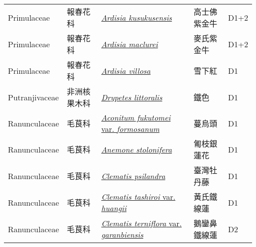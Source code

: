 {\begin{longtable}{p{2.5cm}p{2cm}p{5cm}p{2.5cm}p{3cm}}
    Primulaceae & 報春花科 & \href{http://www.theplantlist.org/tpl1.1/search?q=Ardisia+kusukusensis}{\textit{Ardisia kusukusensis} } & 高士佛紫金牛 & D1+2 \index{Ardisia@\textit{Ardisia}!kusukusensis@\textit{kusukusensis}}  \index{高士佛紫金牛} \\
    Primulaceae & 報春花科 & \href{http://www.theplantlist.org/tpl1.1/search?q=Ardisia+maclurei}{\textit{Ardisia maclurei} } & 麥氏紫金牛 & D1+2 \index{Ardisia@\textit{Ardisia}!maclurei@\textit{maclurei}}  \index{麥氏紫金牛} \\
    Primulaceae & 報春花科 & \href{http://www.theplantlist.org/tpl1.1/search?q=Ardisia+villosa}{\textit{Ardisia villosa} } & 雪下紅 & D1 \index{Ardisia@\textit{Ardisia}!villosa@\textit{villosa}}  \index{雪下紅} \\
    Putranjivaceae & 非洲核果木科 & \href{http://www.theplantlist.org/tpl1.1/search?q=Drypetes+littoralis}{\textit{Drypetes littoralis} } & 鐵色 & D1 \index{Drypetes@\textit{Drypetes}!littoralis@\textit{littoralis}}  \index{鐵色} \\
    Ranunculaceae & 毛茛科 & \href{http://www.theplantlist.org/tpl1.1/search?q=Aconitum+fukutomei+var.+formosanum}{\textit{Aconitum fukutomei} var. \textit{formosanum} } & 蔓烏頭 & D1 \index{Aconitum@\textit{Aconitum}!fukutomei@\textit{fukutomei}!var. formosanum@var. \textit{formosanum}}  \index{蔓烏頭} \\
    Ranunculaceae & 毛茛科 & \href{http://www.theplantlist.org/tpl1.1/search?q=Anemone+stolonifera}{\textit{Anemone stolonifera} } & 匍枝銀蓮花 & D1 \index{Anemone@\textit{Anemone}!stolonifera@\textit{stolonifera}}  \index{匍枝銀蓮花} \\
    Ranunculaceae & 毛茛科 & \href{http://www.theplantlist.org/tpl1.1/search?q=Clematis+psilandra}{\textit{Clematis psilandra} } & 臺灣牡丹藤 & D1 \index{Clematis@\textit{Clematis}!psilandra@\textit{psilandra}}  \index{臺灣牡丹藤} \\
    Ranunculaceae & 毛茛科 & \href{http://www.theplantlist.org/tpl1.1/search?q=Clematis+tashiroi+var.+huangii}{\textit{Clematis tashiroi} var. \textit{huangii} } & 黃氏鐵線蓮 & D1 \index{Clematis@\textit{Clematis}!tashiroi@\textit{tashiroi}!var. huangii@var. \textit{huangii}}  \index{黃氏鐵線蓮} \\
    Ranunculaceae & 毛茛科 & \href{http://www.theplantlist.org/tpl1.1/search?q=Clematis+terniflora+var.+garanbiensis}{\textit{Clematis terniflora} var. \textit{garanbiensis} } & 鵝鑾鼻鐵線蓮 & D2 \index{Clematis@\textit{Clematis}!terniflora@\textit{terniflora}!var. garanbiensis@var. \textit{garanbiensis}}  \index{鵝鑾鼻鐵線蓮} \\

\end{longtable}}
